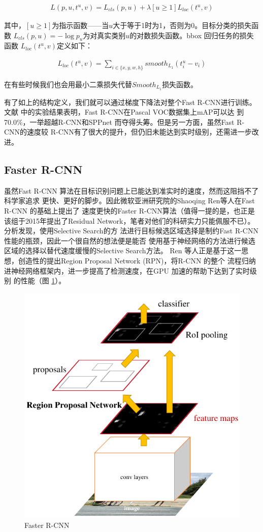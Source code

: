 \begin{align}
L(p, u, t^u, v) = L_{cls}(p, u) + \lambda[u \geq 1]L_{loc}(t^u, v)
\end{align}

其中，$[u \geq 1]$为指示函数——当$u$大于等于1时为1，否则为0。目标分类的损失函数
$L_{cls}(p,u) = -\log{p_u}$为对真实类别$u$的对数损失函数。bbox 回归任务的损失函数
$L_{loc}(t^u,v)$定义如下：

\begin{align}
L_{loc}(t^u, v) = \sum_{i\in \{x,y,w,h\}}{smooth_{L_1}(t_i^u-v_i)}
\end{align}

在有些时候我们也会用最小二乘损失代替$Smooth_{L_1}$损失函数。

有了如上的结构定义，我们就可以通过梯度下降法对整个Fast R-CNN进行训练。文献
\cite{Girshick:2015ib}中的实验结果表明，Fast R-CNN在Pascal VOC数据集上mAP可以达
到70.0\%，一举超越R-CNN和SPPnet 而夺得头筹。但是另一方面，虽然Fast R-CNN的速度较
R-CNN有了很大的提升，但仍旧未能达到实时级别，还需进一步改进。

\subsection{Faster R-CNN}

虽然Fast R-CNN 算法在目标识别问题上已能达到准实时的速度，然而这阻挡不了科学家追求
更快、更好的脚步。因此微软亚洲研究院的Shaoqing Ren等人在Fast R-CNN 的基础上提出了
速度更快的Faster R-CNN算法\cite{Ren:2015ug}（值得一提的是，也正是该组于2015年提出了Residual
Network，笔者对他们的科研实力只能佩服不已）。分析发现，使用Selective Search的方
法进行目标候选区域选择是制约Fast R-CNN 性能的瓶颈，因此一个很自然的想法便是能否
使用基于神经网络的方法进行候选区域的选择以替代速度缓慢的Selective Search方法。
Ren 等人正是基于这一思想，创造性的提出Region Proposal Network (RPN)，将R-CNN 的整个
流程归纳进神经网络框架内，进一步提高了检测速度，在GPU 加速的帮助下达到了实时级别
的性能（图 \ref{Fig:FasterRCNN}）。

\begin{figure}[ht]
  \centering
  \includegraphics[width=0.8\linewidth]{./Figure/FasterRCNN.png}
  \caption{Faster R-CNN\cite{Ren:2015ug}}\label{Fig:FasterRCNN}
\end{figure}

